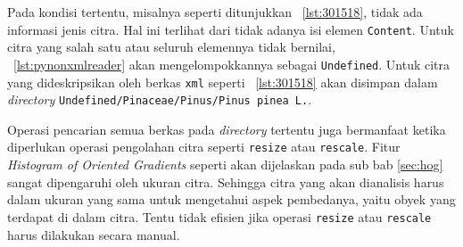Pada kondisi tertentu, misalnya seperti ditunjukkan \lstlistingname~\ref{lst:301518}, tidak ada informasi jenis citra. Hal ini terlihat dari tidak adanya isi elemen \texttt{Content}. Untuk citra yang salah satu atau seluruh elemennya tidak bernilai, \lstlistingname~\ref{lst:pynonxmlreader} akan mengelompokkannya sebagai \texttt{Undefined}. Untuk citra yang dideskripsikan oleh berkas \texttt{xml} seperti \lstlistingname~\ref{lst:301518} akan disimpan dalam \textit{directory} \texttt{Undefined/Pinaceae/Pinus/Pinus\ pinea\ L.}.

\scriptsize

\normalsize

Operasi pencarian semua berkas pada \textit{directory} tertentu juga bermanfaat ketika diperlukan operasi pengolahan citra seperti \texttt{resize} atau \texttt{rescale}. Fitur \textit{Histogram of Oriented Gradients} seperti akan dijelaskan pada sub bab \ref{sec:hog} sangat dipengaruhi oleh ukuran citra. Sehingga citra yang akan dianalisis harus dalam ukuran yang sama untuk mengetahui aspek pembedanya, yaitu obyek yang terdapat di dalam citra. Tentu tidak efisien jika operasi \texttt{resize} atau \texttt{rescale} harus dilakukan secara manual.

